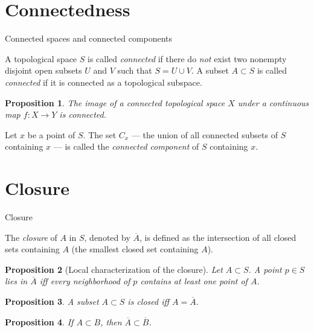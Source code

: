 \documentclass[10pt]{beamer}
\newtheorem{proposition}{Proposition}
\begin{document}
\section{Connectedness}

\begin{frame}{Connected spaces and connected components}
	\begin{definition}
		A topological space $S$ is called \emph{connected} if there do
		\emph{not} exist two nonempty disjoint open subsets $U$ and $V$ such
		that $S = U \cup V$. A subset $A \subset S$ is called \emph{connected}
		if it is connected as a topological subspace.
	\end{definition}
	\begin{proposition}
		The image of a connected topological space $X$ under a continuous map
		$f: X \to Y$ is connected.
	\end{proposition}
	\begin{definition}
		Let $x$ be a point of $S$. The set $C_x$ --- the union of all connected
		subsets of $S$ containing $x$ --- is called the \emph{connected
			component} of $S$ containing $x$.
	\end{definition}
\end{frame}

\section{Closure}

\begin{frame}{Closure}
	\begin{definition}[Closure]
		The \emph{closure} of $A$ in $S$, denoted by $\overline{A}$, is defined
		as the intersection of all closed sets containing $A$ (the smallest
		closed set containing $A$).
	\end{definition}
	\begin{proposition}[Local characterization of the closure]
		Let $A \subset S$. A point $p \in S$ lies in $\overline{A}$ iff every
		neighborhood of $p$ contains at least one point of $A$.
	\end{proposition}
	\begin{proposition}
		A subset $A \subset S$ is closed iff $A = \overline{A}$.
	\end{proposition}
	\begin{proposition}
		If $A \subset B$, then $\overline{A} \subset \overline{B}$.
	\end{proposition}
\end{frame}
\end{document}
